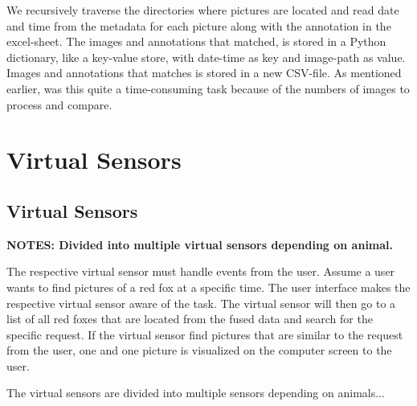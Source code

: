 \documentclass[USenglish]{uit-thesis}
\begin{document}
We recursively traverse the directories where pictures are located and read date and time from the metadata for each picture along with the annotation in the excel-sheet. The images and annotations that matched, is stored in a Python dictionary, like a key-value store, with date-time as key and image-path as value. Images and annotations that matches is stored in a new CSV-file.
As mentioned earlier, was this quite a time-consuming task because of the numbers of images to process and compare.




\section{Virtual Sensors}



\subsection{Virtual Sensors} \label{ssec:des_vs}
\textbf{NOTES: Divided into multiple virtual sensors depending on animal.}

The respective virtual sensor must handle events from the user. Assume a user wants to find pictures of a red fox at a specific time.  The user interface makes the respective virtual sensor aware of the task. The virtual sensor will then go to a list of all red foxes that are located from the fused data and search for the specific request. If the virtual sensor find pictures that are similar to the request from the user, one and one picture is visualized on the computer screen to the user.

The virtual sensors are divided into multiple sensors depending on animals...
\end{document}
